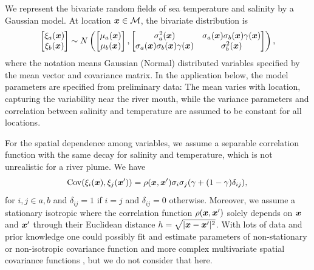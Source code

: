\documentclass[aoas]{imsart}
\begin{document}
We represent the bivariate random fields of sea temperature and
salinity by a Gaussian model.  At location ${\boldsymbol x} \in \mathcal{M}$, the bivariate distribution is
\begin{equation}\label{gp_bar}
\begin{bmatrix}\xi_a(\bx) \\
\xi_b(\bx) 
\end{bmatrix}
 \sim N \left( 
\begin{bmatrix} \mu_{a}(\bx)\\
\mu_{b}(\bx)
\end{bmatrix},\begin{bmatrix}
\sigma_{a}^2(\bx) & \sigma_{a}(\bx) \sigma_b(\bx) \gamma(\bx)  \\
\sigma_{a}(\bx) \sigma_b(\bx) \gamma(\bx)  & \sigma_{b}^2(\bx) 
\end{bmatrix}
\right),
\end{equation}
where the notation means Gaussian (Normal) distributed variables specified by the mean vector and covariance matrix.
In the application below, the model parameters are specified from preliminary data: The mean varies with location, capturing the variability near the river mouth, while the variance parameters and correlation between salinity and
temperature are assumed to be constant for all locations. 

For the spatial dependence among variables, 
we assume a separable correlation function with the same decay for salinity and temperature,
which is not unrealistic for a river plume. We have
\begin{equation}\label{gp_corr}
\mbox{Cov}(\xi_i(\bx),\xi_j(\bx')) = \rho(\bx,\bx') \sigma_i \sigma_j (\gamma +(1-\gamma )\delta_{ij}), \\
\end{equation}
for $i,j \in {a,b}$ and $\delta_{ij}=1$ if $i=j$ and $\delta_{ij}=0$ otherwise.
Moreover, we assume a stationary isotropic where the correlation function
$\rho({\boldsymbol x},{\boldsymbol x}')$ solely depends on ${\boldsymbol x}$ and ${\boldsymbol x}'$ through their Euclidean distance $h=\sqrt{|{\boldsymbol x}-{\boldsymbol x}'|^2}$.
With lots of data and prior knowledge one could possibly fit and estimate parameters of non-stationary or non-isotropic covariance function and more complex multivariate spatial covariance functions
\citep{gneiting2010matern,genton2015cross}, but we do not consider that here.
\end{document}
